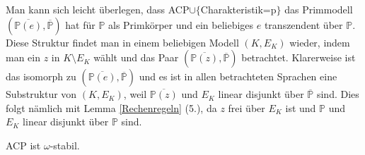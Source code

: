     \begin{remark}
    	Man kann sich leicht überlegen, dass ACP$\cup\{$\glqq{}Charakteristik=p\grqq{}$\}$ das Primmodell $(\overline{\mathbb{P}(e)},\overline{\mathbb{P}})$ hat für $\mathbb{P}$ als Primkörper und ein beliebiges $e$ transzendent über $\mathbb{P}$. Diese Struktur findet man in einem beliebigen Modell $(K,E_K)$ wieder, indem man ein $z$ in $K\setminus E_K$ wählt und das Paar $(\overline{\mathbb{P}(z)},\overline{\mathbb{P}})$ betrachtet. Klarerweise ist das isomorph zu $(\overline{\mathbb{P}(e)},\overline{\mathbb{P}})$ und es ist in allen betrachteten Sprachen eine Substruktur von $(K,E_K)$, weil $\overline{\mathbb{P}(z)}$ und $E_K$ linear disjunkt über $\overline{\mathbb{P}}$ sind. Dies folgt nämlich mit Lemma \ref{Rechenregeln} (5.), da $z$ frei über $E_K$ ist und $\mathbb{P}$ und $E_K$ linear disjunkt über $\mathbb{P}$ sind.
    \end{remark}
    \newpage
    \begin{theorem}
    	ACP ist $\omega$-stabil.
    \end{theorem}
